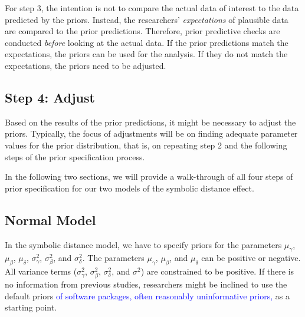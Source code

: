 \documentclass[
  english,
  doc,floatsintext]{apa6}
\begin{document}
For step 3, the intention is not to compare the actual data of interest to the data predicted by the priors. Instead, the researchers' \emph{expectations} of plausible data are compared to the prior predictions. Therefore, prior predictive checks are conducted \emph{before} looking at the actual data. If the prior predictions match the expectations, the priors can be used for the analysis. If they do not match the expectations, the priors need to be adjusted.

\hypertarget{step-4-adjust}{%
\subsection{Step 4: Adjust}\label{step-4-adjust}}

Based on the results of the prior predictions, it might be necessary to adjust the priors. Typically, the focus of adjustments will be on finding adequate parameter values for the prior distribution, that is, on repeating step 2 and the following steps of the prior specification process.

In the following two sections, we will provide a walk-through of all four steps of prior specification for our two models of the symbolic distance effect.

\hypertarget{normal-model-1}{%
\subsection{Normal Model}\label{normal-model-1}}

In the symbolic distance model, we have to specify priors for the parameters \(\mu_{\gamma}\), \(\mu_{\beta}\), \(\mu_{\delta}\), \(\sigma^2_{\gamma}\), \(\sigma^2_{\beta}\), and \(\sigma^2_{\delta}\). The parameters \(\mu_{\gamma}\), \(\mu_{\beta}\), and \(\mu_{\delta}\) can be positive or negative. All variance terms (\(\sigma_{\gamma}^2\), \(\sigma_{\beta}^2\), \(\sigma_{\delta}^2\), and \(\sigma^2\)) are constrained to be positive. If there is no information from previous studies, researchers might be inclined to use the default priors \textcolor{blue}{of software packages, often reasonably uninformative priors,} as a starting point.
\end{document}
